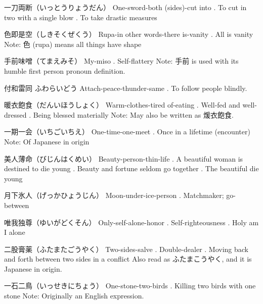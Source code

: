 \par{一刀両断（いっとうりょうだん） \hfill\break
One-sword-both (sides)-cut into \hfill{}. To cut in two with a single blow \hfill{}. To take drastic measures }

\par{色即是空（しきそくぜくう） \hfill\break
Rupa-in other words-there is-vanity \hfill{}. All is vanity \hfill\break
Note: 色 (rupa) means all things have shape }

\par{手前味噌（てまえみそ） \hfill\break
My-miso \hfill{}. Self-flattery \hfill\break
Note: 手前 is used with its humble first person pronoun definition. }

\par{付和雷同 \hfill\break
ふわらいどう \hfill\break
Attach-peace-thunder-same \hfill{}. To follow people blindly. }

\par{暖衣飽食（だんいほうしょく） \hfill\break
Warm-clothes-tired of-eating \hfill{}. Well-fed and well-dressed \hfill{}. Being blessed materially \hfill\break
Note: May also be written as 煖衣飽食. }

\par{一期一会（いちごいちえ） \hfill\break
One-time-one-meet \hfill{}. Once in a lifetime (encounter) \hfill\break
Note: Of Japanese in origin }

\par{美人薄命（びじんはくめい） \hfill\break
Beauty-person-thin-life \hfill{}. A beautiful woman is destined to die young \hfill{}. Beauty and fortune seldom go together \hfill{}. The beautiful die young }

\par{月下氷人（げっかひょうじん） \hfill\break
Moon-under-ice-person \hfill{}. Matchmaker; go-between }

\par{唯我独尊（ゆいがどくそん） \hfill\break
Only-self-alone-honor \hfill{}. Self-righteousness \hfill{}. Holy am I alone }

\par{二股膏薬（ふたまたごうやく） \hfill\break
Two-sides-salve \hfill{}. Double-dealer \hfill{}. Moving back and forth between two sides in a conflict \hfill\break
Also read as ふたまこうやく, and it is Japanese in origin. }

\par{一石二鳥（いっせきにちょう） \hfill\break
One-stone-two-birds \hfill{}. Killing two birds with one stone \hfill\break
Note: Originally an English expression. }

